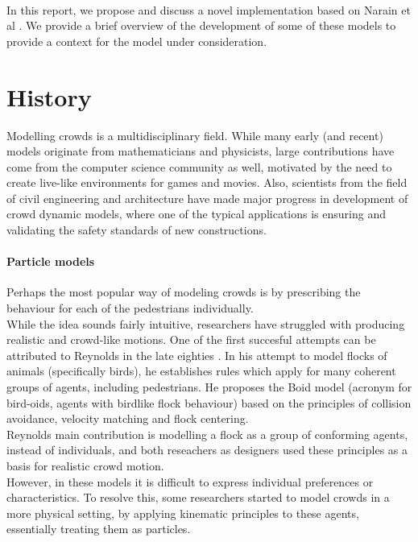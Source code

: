 \documentclass{article}
\begin{document}
\ \\
In this report, we propose and discuss a novel implementation based on Narain et al \cite{Narain04}.
 We provide a brief overview of the development of some of these models to provide a context for the model under consideration.
\newpage

\section{History}
Modelling crowds is a multidisciplinary field. While many early (and recent) models originate from mathematicians and physicists, large contributions have come from the computer science community as well, motivated by the need to create live-like environments for games and movies.
Also, scientists from the field of civil engineering and architecture have made major progress in development of crowd dynamic models, where one of the typical applications is ensuring and validating the safety standards of new constructions.
\paragraph{Particle models}
Perhaps the most popular way of modeling crowds is by prescribing the behaviour for each of the pedestrians individually.\\
While the idea sounds fairly intuitive, researchers have struggled with producing realistic and crowd-like motions. One of the first succesful attempts can be attributed to Reynolds in the late eighties \cite{Reynolds88}. In his attempt to model flocks of animals (specifically birds), he establishes rules which apply for many coherent groups of agents, including pedestrians. He proposes the Boid model (acronym for bird-oids, agents with birdlike flock behaviour) based on the principles of collision avoidance, velocity matching and flock centering.
\ \\
Reynolds main contribution is modelling a flock as a group of conforming agents, instead of individuals, and both reseachers as designers used these principles as a basis for realistic crowd motion.\\
However, in these models it is difficult to express individual preferences or characteristics. To resolve this, some researchers started to model crowds in a more physical setting, by applying kinematic principles to these agents, essentially treating them as particles.
\end{document}
